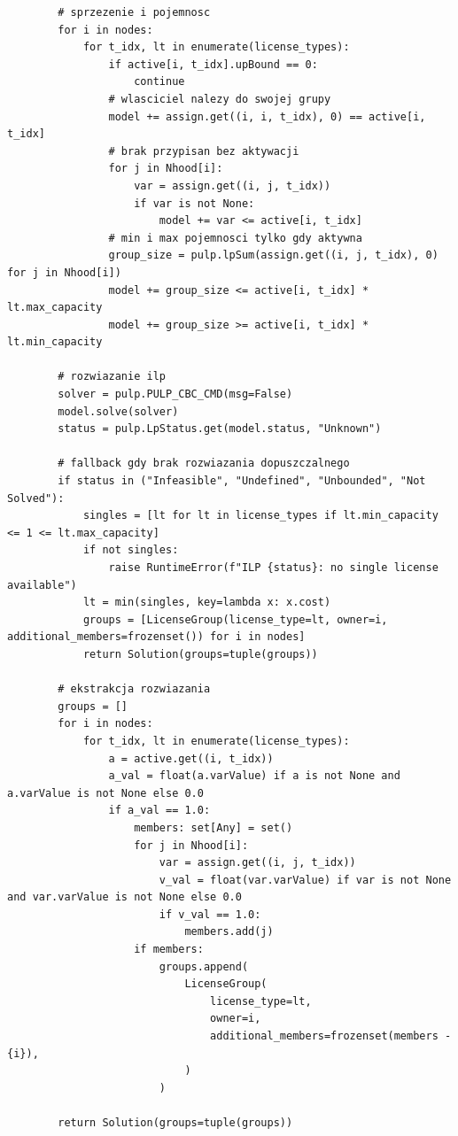 {\begin{verbatim}
        # sprzezenie i pojemnosc
        for i in nodes:
            for t_idx, lt in enumerate(license_types):
                if active[i, t_idx].upBound == 0:
                    continue
                # wlasciciel nalezy do swojej grupy
                model += assign.get((i, i, t_idx), 0) == active[i, t_idx]
                # brak przypisan bez aktywacji
                for j in Nhood[i]:
                    var = assign.get((i, j, t_idx))
                    if var is not None:
                        model += var <= active[i, t_idx]
                # min i max pojemnosci tylko gdy aktywna
                group_size = pulp.lpSum(assign.get((i, j, t_idx), 0) for j in Nhood[i])
                model += group_size <= active[i, t_idx] * lt.max_capacity
                model += group_size >= active[i, t_idx] * lt.min_capacity

        # rozwiazanie ilp
        solver = pulp.PULP_CBC_CMD(msg=False)
        model.solve(solver)
        status = pulp.LpStatus.get(model.status, "Unknown")

        # fallback gdy brak rozwiazania dopuszczalnego
        if status in ("Infeasible", "Undefined", "Unbounded", "Not Solved"):
            singles = [lt for lt in license_types if lt.min_capacity <= 1 <= lt.max_capacity]
            if not singles:
                raise RuntimeError(f"ILP {status}: no single license available")
            lt = min(singles, key=lambda x: x.cost)
            groups = [LicenseGroup(license_type=lt, owner=i, additional_members=frozenset()) for i in nodes]
            return Solution(groups=tuple(groups))

        # ekstrakcja rozwiazania
        groups = []
        for i in nodes:
            for t_idx, lt in enumerate(license_types):
                a = active.get((i, t_idx))
                a_val = float(a.varValue) if a is not None and a.varValue is not None else 0.0
                if a_val == 1.0:
                    members: set[Any] = set()
                    for j in Nhood[i]:
                        var = assign.get((i, j, t_idx))
                        v_val = float(var.varValue) if var is not None and var.varValue is not None else 0.0
                        if v_val == 1.0:
                            members.add(j)
                    if members:
                        groups.append(
                            LicenseGroup(
                                license_type=lt,
                                owner=i,
                                additional_members=frozenset(members - {i}),
                            )
                        )

        return Solution(groups=tuple(groups))
\end{verbatim}
    }


